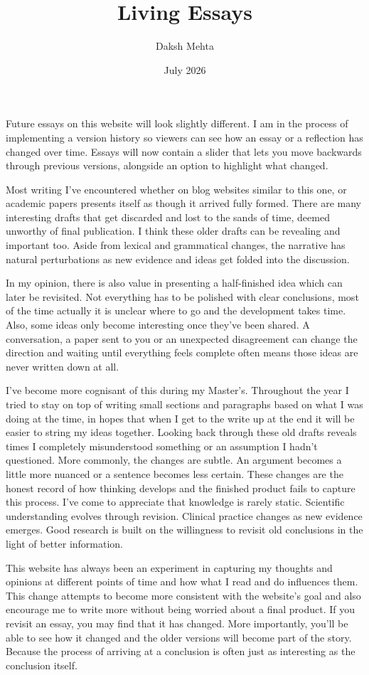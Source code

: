 \documentclass{article}
\title{Living Essays}
\date{July 2026}
\author{Daksh Mehta}
\begin{document}
	
Future essays on this website will look slightly different. I am in the process of implementing a version history so viewers can see how an essay or a reflection has changed over time. Essays will now contain a slider that lets you move backwards through previous versions, alongside an option to highlight what changed. 

Most writing I've encountered whether on blog websites similar to this one, or academic papers presents itself as though it arrived fully formed. There are many interesting drafts that get discarded and lost to the sands of time, deemed unworthy of final publication. I think these older drafts can be revealing and important too. Aside from lexical and grammatical changes, the narrative has natural perturbations as new evidence and ideas get folded into the discussion. 

In my opinion, there is also value in presenting a half-finished idea which can later be revisited. Not everything has to be polished with clear conclusions, most of the time actually it is unclear where to go and the development takes time. Also, some ideas only become interesting once they've been shared. A conversation, a paper sent to you or an unexpected disagreement can change the direction and waiting until everything feels complete often means those ideas are never written down at all. 

I've become more cognisant of this during my Master's. Throughout the year I tried to stay on top of writing small sections and paragraphs based on what I was doing at the time, in hopes that when I get to the write up at the end it will be easier to string my ideas together. Looking back through these old drafts reveals times I completely misunderstood something or an assumption I hadn't questioned. More commonly, the changes are subtle. An argument becomes a little more nuanced or a sentence becomes less certain. These changes are the honest record of how thinking develops and the finished product fails to capture this process. I’ve come to appreciate that knowledge is rarely static. Scientific understanding evolves through revision. Clinical practice changes as new evidence emerges. Good research is built on the willingness to revisit old conclusions in the light of better information.

This website has always been an experiment in capturing my thoughts and opinions at different points of time and how what I read and do influences them. This change attempts to become more consistent with the website's goal and also encourage me to write more without being worried about a final product. If you revisit an essay, you may find that it has changed. More importantly, you'll be able to see how it changed and the older versions will become part of the story. Because the process of arriving at a conclusion is often just as interesting as the conclusion itself. 
	
\end{document}
